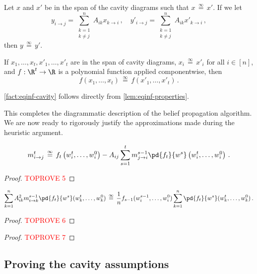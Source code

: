 \documentclass[12pt]{article}
\newcommand{\eqinf}{\,\overset{\infty}{=}\,}
\begin{document}
\begin{claim}\label{fact:eqinf-cavity}
    Let $x$ and $x'$ be in the span of the cavity diagrams such that $x\eqinf x'$.
    If we let
    \[
        y_{i\to j} = \sum_{\substack{k=1\\k\neq j}}^n A_{ik} x_{k\to i}\,,\quad y'_{i\to j} = \sum_{\substack{k=1\\k\neq j}}^n A_{ik} x'_{k\to i}\,,
    \]
    then $y\eqinf y'$.

    If $x_1, \ldots, x_t, x'_1, \ldots, x'_t$ are in the span of cavity diagrams, $x_i\eqinf x'_i$ for all $i\in [n]$, and $f:\R^t\to \R$ is a polynomial function applied componentwise, then
    \[
        f(x_1, \ldots, x_t)\eqinf f(x'_1, \ldots, x'_t)\,.
    \]
\end{claim}

\cref{fact:eqinf-cavity} follows directly from \cref{lem:eqinf-properties}.





This completes the diagrammatic description of the belief
propagation algorithm.
We are now ready to rigorously justify the approximations made during the heuristic argument.


\begin{lemma}
    \[
        m^{t}_{i\to j} \eqinf f_{t}\left(w^{t}_i, \ldots, w_i^0\right) - A_{ij}\sum_{s = 1}^{t} m_{j \to i}^{s-1} \pd{f_{t}}{w^s}\left(w^{t}_i, \ldots, w_i^0\right)\,.
    \]
\end{lemma}

\begin{proof}\textcolor{red}{TOPROVE 5}\end{proof}

\begin{lemma}
    \[
        \sum_{k=1}^n A_{ik}^2 m_{i\to k}^{s-1} \pd{f_t}{w^s}(w_k^t, \dots, w_k^0) \eqinf \frac 1 n f_{s-1}(w^{s-1}_i,\ldots,w^0_i) \sum_{k=1}^n \pd{f_t}{w^s}(w_k^t, \dots, w_k^0)\,.
    \]
\end{lemma}

\begin{proof}\textcolor{red}{TOPROVE 6}\end{proof}

\begin{proof}\textcolor{red}{TOPROVE 7}\end{proof}

\subsection{Proving the cavity assumptions}
\label{sec:cavity-formal}
\end{document}
